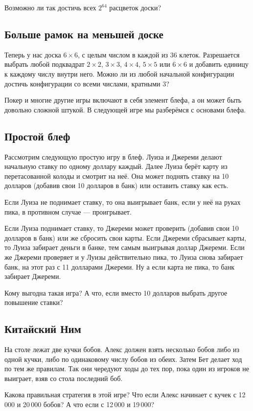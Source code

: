 Возможно ли так достичь всех $2^{64}$ расцветок доски?

\subsection*{Больше рамок на меньшей доске}

Теперь у нас доска $6 \times 6$, с целым числом в каждой из $36$ клеток.
Разрешается выбрать любой подквадрат $2 \times 2$, $3 \times 3$, $4 \times 4$, $5 \times 5$ или $6 \times 6$ и добавить единицу к каждому числу внутри него.
Можно ли из любой начальной конфигурации достичь конфигурации со всеми числами, кратными $3$?


\medskip

Покер и многие другие игры включают в себя элемент блефа, а он может быть довольно сложной штукой.
В следующей игре мы разберёмся с основами блефа.

\subsection*{Простой блеф}

Рассмотрим следующую простую игру в блеф.
Луиза и Джереми делают начальную ставку по одному доллару каждый.
Далее Луиза берёт карту из перетасованной колоды и смотрит на неё.
Она может поднять ставку на 10 долларов (добавив свои 10 долларов в банк) или оставить ставку как есть.

Если Луиза не поднимает ставку, то она выигрывает банк, если у неё на руках пика, в противном случае --- проигрывает.

Если Луиза поднимает ставку, то Джереми может проверить (добавив свои 10 долларов в банк) или же сбросить свои карты.
Если Джереми сбрасывает карты, то Луиза забирает деньги в банке, тем самым выигрывая доллар Джереми.
Если же Джереми проверяет и у Луизы действительно пика, то Луиза снова забирает банк, на этот раз с 11 долларами Джереми.
Ну а если карта не пика, то банк забирает Джереми.

Кому выгодна такая игра?
А что, если вместо 10 долларов выбрать другое повышение ставки?

\subsection*{Китайский Ним}

На столе лежат две кучки бобов.
Алекс должен взять несколько бобов либо из одной кучки, либо по одинаковому числу бобов из обеих.
Затем Бет делает ход по тем же правилам.
Так они чередуют ходы до тех пор, пока один из игроков не выиграет, взяв со стола последний боб.

Какова правильная стратегия в этой игре?
Что если Алекс начинает с кучек с 12\,000 и 20\,000 бобов?
А что если с 12\,000 и 19\,000?

